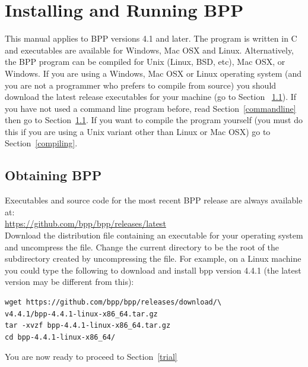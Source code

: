 \documentclass[a4paper]{book}
\numberwithin{equation}{section} \renewcommand{\baselinestretch}{0.55}
\begin{document}
\chapter{Installing and Running BPP}

This manual applies to \textsc{BPP} versions 4.1 and later.  The
program is written in C and executables are available for Windows, Mac
OSX and Linux. Alternatively, the \textsc{BPP} program can be compiled
for Unix (Linux, BSD, etc), Mac OSX, or Windows. If you are using a
Windows, Mac OSX or Linux operating system (and you are not a
programmer who prefers to compile from source) you should download the
latest release executables for your machine (go to Section
~\ref{download}). If you have not used a command line program before,
read Section~\ref{commandline} then go to Section~\ref{download}. If
you want to compile the program yourself (you must do this if you are
using a Unix variant other than Linux or Mac OSX) go to
Section~\ref{compiling}.

\section{Obtaining BPP}\label{download}
Executables and source code for the most recent \textsc{BPP} release
are always available at:
\newline \noindent \vspace{0.1pt} \\
\href{https://github.com/bpp/bpp/releases/latest}{https://github.com/bpp/bpp/releases/latest}
\newline \noindent \vspace{0.1pt} \\
Download the distribution file containing an executable for your
operating system and uncompress the file. Change the current directory
to be the root of the subdirectory created by uncompressing the file.
For example, on a Linux machine you could type the following to
download and install bpp version 4.4.1 (the latest version may be
different from this):
\begin{verbatim}
wget https://github.com/bpp/bpp/releases/download/\
v4.4.1/bpp-4.4.1-linux-x86_64.tar.gz
tar -xvzf bpp-4.4.1-linux-x86_64.tar.gz
cd bpp-4.4.1-linux-x86_64/
\end{verbatim}
\noindent
You are now ready to proceed to Section~\ref{trial}
\end{document}

